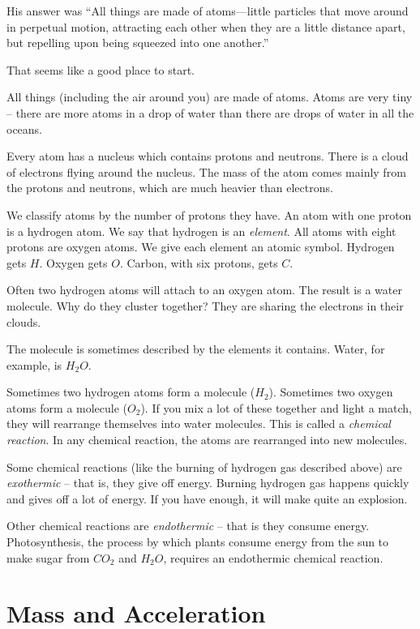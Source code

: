 His answer was ``All things are made of atoms—little particles that move around in
perpetual motion, attracting each other when they are a little
distance apart, but repelling upon being squeezed into one another.''

That seems like a good place to start.

All things (including the air around you) are made of atoms. Atoms are
very tiny -- there are more atoms in a drop of water than there are
drops of water in all the oceans.

Every atom has a nucleus which contains protons and neutrons. There is
a cloud of electrons flying around the nucleus. The mass of the atom
comes mainly from the protons and neutrons, which are much heavier
than electrons.

We classify atoms by the number of protons they have. An atom with one
proton is a hydrogen atom. We say that hydrogen is an
\textit{element}. All atoms with eight protons are oxygen atoms. We
give each element an atomic symbol. Hydrogen gets $H$.  Oxygen
gets $O$. Carbon, with six protons, gets $C$.

Often two hydrogen atoms will attach to an oxygen atom.  The result is
a water molecule. Why do they cluster together? They are sharing the
electrons in their clouds.

The molecule is sometimes described by the elements it contains.
Water, for example, is $H_2O$.

Sometimes two hydrogen atoms form a molecule ($H_2$). Sometimes two
oxygen atoms form a molecule ($O_2$). If you mix a lot of these
together and light a match, they will rearrange themselves into water
molecules. This is called a \textit{chemical reaction}.  In any
chemical reaction, the atoms are rearranged into new molecules.

Some chemical reactions (like the burning of hydrogen gas described
above) are \textit{exothermic} -- that is, they give off energy.
Burning hydrogen gas happens quickly and gives off a lot of energy. If
you have enough, it will make quite an explosion.

Other chemical reactions are \textit{endothermic} -- that is they consume
energy.  Photosynthesis, the process by which plants consume energy
from the sun to make sugar from $CO_2$ and $H_2O$, requires an endothermic
chemical reaction.

\section{Mass and Acceleration}

